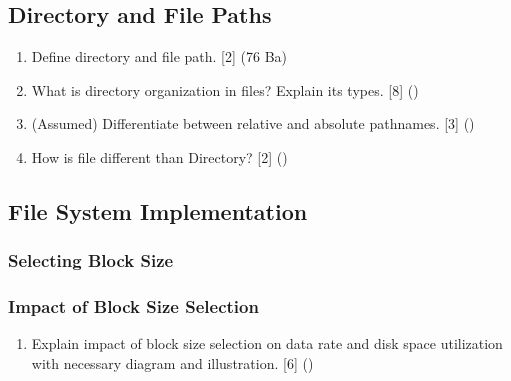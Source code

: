 \documentclass[12pt]{article}
\begin{document}
	\subsection{Directory and File Paths}
		\begin{enumerate}[noitemsep, topsep=0pt]
			\item Define directory and file path. \hfill [2] (76 Ba)
			
			\item What is directory organization in files? Explain its types. \hfill [8] ()

			\item (Assumed) Differentiate between relative and absolute pathnames. \hfill [3] ()

			\item How is file different than Directory? \hfill [2] ()
		\end{enumerate}

	\subsection{File System Implementation}
		\subsubsection{Selecting Block Size}
		\subsubsection{Impact of Block Size Selection}
			\begin{enumerate}[noitemsep, topsep=0pt]
				\item Explain impact of block size selection on data rate and disk space utilization with necessary diagram and illustration. \hfill [6] ()
			\end{enumerate}
\end{document}
